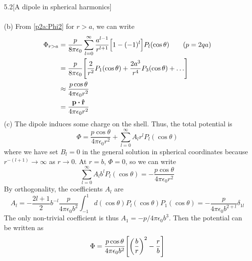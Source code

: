 \documentclass[12pt]{article}
\begin{document}
\begin{problem}{5.2}[A dipole in spherical harmonics]
\begin{solution}
\begin{align}
\end{align}
(b) From \eqref{p2a:Phi2} for $r>a$, we can write
\begin{align}
    \Phi_{r>a}&=\frac{p}{8\pi\epsilon_0}\sum_{l=0}^\infty 
    \frac{a^{l-1}}{r^{l+1}}\qty[1-(-1)^l]P_l(\cos\theta)\tag{$p=2qa$}\\
    &=\frac{p}{8\pi\epsilon_0}\qty[
        \frac{2}{r^2}P_1(\cos\theta)+\frac{2a^3}{r^4}P_3(\cos\theta)+\hdots]\notag\\
    &\approx\frac{p\cos\theta}{4\pi\epsilon_0r^2}\notag\\
    &=\frac{\vb{p}\vdot\rhat}{4\pi\epsilon_0r^2}
\end{align}
(c) The dipole induces some charge on the shell. Thus, the total potential is
\begin{equation}
    \Phi=\frac{p\cos\theta}{4\pi\epsilon_0r^2}+\sum_{l=0}^\infty
    A_lr^lP_l(\cos\theta) 
\end{equation}
where we have set $B_l=0$ in the general solution in spherical coordinates
because $r^{-(l+1)}\to\infty$ as $r\to 0$. At $r=b$, $\Phi=0$, so we can write
\begin{equation}
    \sum_{l=0}^\infty
    A_lb^lP_l(\cos\theta)=-\frac{p\cos\theta}{4\pi\epsilon_0r^2} 
\end{equation}
By orthogonality, the coefficients $A_l$ are 
\begin{equation}
    A_l=-\frac{2l+1}{2}b^{-l}\frac{p}{4\pi\epsilon_0b^2}
    \int_{-1}^1d(\cos\theta)P_l(\cos\theta)P_1(\cos\theta)
    =-\frac{p}{4\pi\epsilon_0 b^{2+l}}\delta_{1l}
\end{equation}
The only non-trivial coefficient is thus $A_1=-p /4\pi\epsilon_0b^3$. Then the
potential can be written as
\begin{equation}
    \Phi=\frac{p\cos\theta}{4\pi\epsilon_0b^2}\qty[\qty(\frac{b}{r})^2-\frac{r}{b}] 
\end{equation}
\end{solution}
\end{problem}
\end{document}
